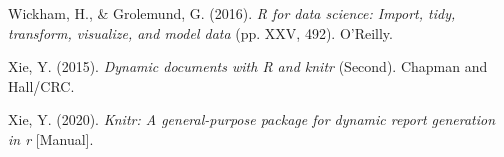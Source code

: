 \documentclass[
  a4paper,
]{article}
\newlength{\cslhangindent}
\newenvironment{CSLReferences}[2] %
 {\begin{list}{}{%
  \setlength{\itemindent}{0pt}
  \setlength{\leftmargin}{0pt}
  \setlength{\parsep}{0pt}
  \ifodd #1
   \setlength{\leftmargin}{\cslhangindent}
   \setlength{\itemindent}{-1\cslhangindent}
  \fi
  \setlength{\itemsep}{#2\baselineskip}}}
 {\end{list}}
\begin{document}
\begin{CSLReferences}{1}{0}
Wickham, H., \& Grolemund, G. (2016). \emph{R for data science: Import,
tidy, transform, visualize, and model data} (pp. XXV, 492). O'Reilly.

Xie, Y. (2015). \emph{Dynamic documents with {R} and knitr} (Second).
{Chapman and Hall/CRC}.

Xie, Y. (2020). \emph{Knitr: {A} general-purpose package for dynamic
report generation in r} {[}Manual{]}.

\end{CSLReferences}
\end{document}
